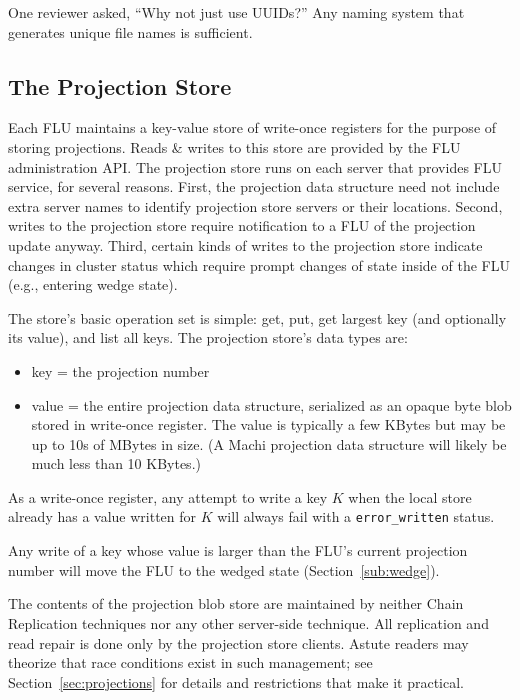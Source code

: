 \documentclass[preprint,10pt]{sigplanconf}
\begin{document}
One reviewer asked, ``Why not just use UUIDs?''  Any naming system
that generates unique file names is sufficient.

\subsection{The Projection Store}
\label{sub:proj-store}

Each FLU maintains a key-value store of write-once registers
for the purpose of storing
projections.  Reads \& writes to this store are provided by the FLU
administration API.  The projection store runs on each server that
provides FLU service, for several reasons.  First, the
projection data structure
need not include extra server names to identify projection
store servers or their locations.
Second, writes to the projection store require
notification to a FLU of the projection update anyway.
Third, certain kinds of writes to the projection store indicate
changes in cluster status which require prompt changes of state inside
of the FLU (e.g., entering wedge state).

The store's basic operation set is simple: get, put, get largest key
(and optionally its value), and list all keys.
The projection store's data types are:

\begin{itemize}
\item key = the projection number
\item value = the entire projection data structure, serialized as an
  opaque byte blob stored in write-once register. The value is 
  typically a few KBytes but may be up to 10s of MBytes in size.
  (A Machi projection data structure will likely be much less than 10
  KBytes.)
\end{itemize}

As a write-once register, any attempt to write a key $K$ when the
local store already has a value written for $K$ will always fail
with a {\tt error\_written} status.

Any write of a key whose value is larger than the FLU's current
projection number will move the FLU to the wedged state
(Section~\ref{sub:wedge}).

The contents of the projection blob store are maintained by neither
Chain Replication techniques nor any other server-side technique.  All
replication and read repair is done only by the projection store
clients.  Astute readers may theorize that race conditions exist in
such management; see Section~\ref{sec:projections} for details and
restrictions that make it practical.
\end{document}
